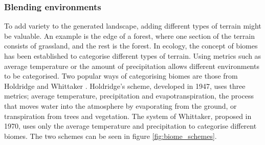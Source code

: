 \documentclass{article}
\begin{document}








\subsubsection{Blending environments}
To add variety to the generated landscape, adding different types of terrain might be valuable. An example is the edge of a forest, where one section of the terrain consists of grassland, and the rest is the forest. In ecology, the concept of biomes has been established to categorise different types of terrain. Using metrics such as average temperature or the amount of precipitation allows different environments to be categorised. Two popular ways of categorising biomes are those from Holdridge and Whittaker \cite{mucina_biome_2019}. Holdridge's scheme, developed in 1947, uses three metrics; average temperature, precipitation and evapotranspiration, the process that moves water into the atmosphere by evaporating from the ground, or transpiration from trees and vegetation. The system of Whittaker, proposed in 1970, uses only the average temperature and precipitation to categorise different biomes. The two schemes can be seen in figure \ref{fig:biome_schemes}.
\end{document}
